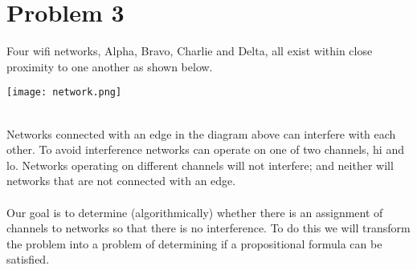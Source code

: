 \documentclass{article}
\begin{document}
\newpage
\section{Problem 3}
Four wifi networks, Alpha, Bravo, Charlie and Delta, all exist within close proximity to one another as shown below.\\
\begin{centering}\hspace*{70pt}\texttt{[image: network.png]}\end{centering}\\
Networks connected with an edge in the diagram above can interfere with each other. To avoid interference networks can operate on one of two channels, hi and lo. Networks operating on different channels will not interfere; and neither will networks that are not connected with an edge.\\\\
Our goal is to determine (algorithmically) whether there is an assignment of channels to networks so that there is no interference. To do this we will transform the problem into a problem of determining if a propositional formula can be satisfied.\\\\\\
\end{document}
